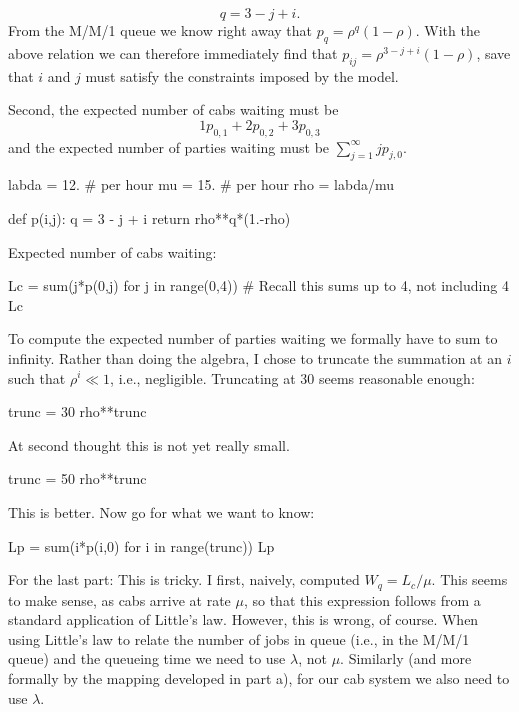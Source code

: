 \begin{exercise}[Hall 5.22]
\begin{solution}
\begin{equation*}
q = 3 - j +i.
\end{equation*}
From the M/M/1 queue we know right away that $p_q = \rho^q
(1-\rho)$.  With the above relation we can therefore immediately find
that $p_{ij} = \rho^{3-j+i}(1-\rho)$, save that $i$ and
$j$ must satisfy the constraints imposed by the model.

Second, the expected number of cabs waiting must be 
\begin{equation*}
1p_{0,1} + 2 p_{0,2} + 3p_{0,3}
\end{equation*}
and the expected number of parties waiting must be $\sum_{j=1}^\infty j p_{j,0}$.

\begin{pyconsole}
labda = 12. # per hour
mu = 15. # per hour
rho = labda/mu

def p(i,j):
    q  = 3 - j + i
    return rho**q*(1.-rho)

\end{pyconsole}
Expected number of  cabs waiting:
\begin{pyconsole}
Lc = sum(j*p(0,j) for j in range(0,4)) 
# Recall this sums up to 4, not including 4
Lc
  
\end{pyconsole}


To compute the expected number of parties waiting we formally have to
sum to infinity. Rather than doing the algebra, I chose to truncate
the summation at an $i$ such that $\rho^i \ll 1$, i.e.,
negligible.  Truncating at 30 seems reasonable enough:

\begin{pyconsole}
trunc = 30
rho**trunc
\end{pyconsole}

At second thought this is not yet really small. 

\begin{pyconsole}
trunc = 50
rho**trunc
\end{pyconsole}


This is better. Now go for what we want to know:

\begin{pyconsole}
Lp = sum(i*p(i,0) for i in range(trunc))
Lp
\end{pyconsole}

For the last part: This is tricky. I first, naively, computed $W_q = L_c/\mu$. This
seems to make sense, as cabs arrive at rate $\mu$, so that this
expression follows from a standard application of Little's
law. However, this is wrong, of course. When using Little's law to
relate the number of jobs in queue (i.e., in the M/M/1 queue) and the
queueing time we need to use $\lambda$, not
$\mu$. Similarly (and more formally by the mapping developed in
part a), for our cab system we also need to use $\lambda$.


\end{solution}
\end{exercise}

